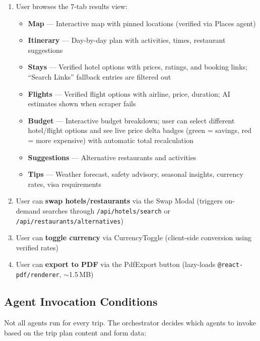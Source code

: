 \documentclass[11pt,a4paper]{article}
\begin{document}
\begin{infobox}
\begin{enumerate}[nosep]
\item User browses the 7-tab results view:
    \begin{itemize}[nosep]
    \item \textbf{Map} --- Interactive map with pinned locations (verified via Places agent)
    \item \textbf{Itinerary} --- Day-by-day plan with activities, times, restaurant suggestions
    \item \textbf{Stays} --- Verified hotel options with prices, ratings, and booking links; ``Search Links'' fallback entries are filtered out
    \item \textbf{Flights} --- Verified flight options with airline, price, duration; AI estimates shown when scraper fails
    \item \textbf{Budget} --- Interactive budget breakdown; user can select different hotel/flight options and see live price delta badges (green = savings, red = more expensive) with automatic total recalculation
    \item \textbf{Suggestions} --- Alternative restaurants and activities
    \item \textbf{Tips} --- Weather forecast, safety advisory, seasonal insights, currency rates, visa requirements
    \end{itemize}
\item User can \textbf{swap hotels/restaurants} via the Swap Modal (triggers on-demand searches through \texttt{/api/hotels/search} or \texttt{/api/restaurants/alternatives})
\item User can \textbf{toggle currency} via CurrencyToggle (client-side conversion using verified rates)
\item User can \textbf{export to PDF} via the PdfExport button (lazy-loads \texttt{@react-pdf/renderer}, $\sim$1.5\,MB)
\end{enumerate}
\end{infobox}

\subsection{Agent Invocation Conditions}

Not all agents run for every trip. The orchestrator decides which agents to invoke based on the trip plan content and form data:
\end{document}
